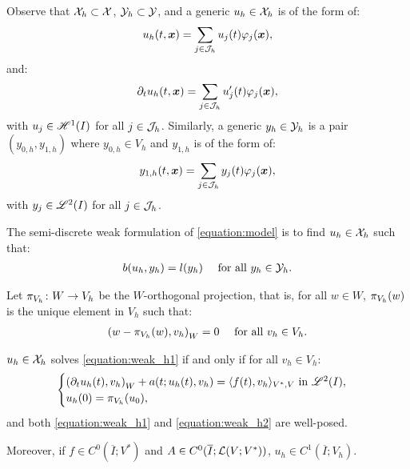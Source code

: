 Observe that $\mathcal{X}_h \subset \mathcal{X}$, $\mathcal{Y}_h \subset \mathcal{Y}$, and a generic $u_h \in \mathcal{X}_h$ is of the form of:
\begin{align}
    u_h(t, \bm{x}) = \sum_{j \in \mathcal{J}_h} u_j(t) \varphi_j(\bm{x}),
\end{align}
and:
\begin{align}
    \partial_t u_h(t, \bm{x}) = \sum_{j \in \mathcal{J}_h} u_j^{\prime}(t) \varphi_j(\bm{x}),
\end{align}
with $u_j \in \mathscr{H}^{1}(I)$ for all $j \in \mathcal{J}_h$. Similarly, a generic $y_h \in \mathcal{Y}_h$ is a pair $(y_{0, h}, y_{1, h})$ where $y_{0, h} \in V_h$ and $y_{1, h}$ is of the form of:
\begin{align}
    y_{1, h}(t, \bm{x}) = \sum_{j \in \mathcal{J}_h} y_j(t) \varphi_j(\bm{x}),
\end{align}
with $y_j \in \mathscr{L}^{2}(I)$ for all $j \in \mathcal{J}_h$.

\begin{definition}
    The semi-discrete weak formulation of \cref{equation:model} is to find $u_h \in \mathcal{X}_h$ such that:
    \begin{align} \label{equation:weak_h1}
        b(u_h, y_h) &= l(y_h) &\text{ for all } y_h \in \mathcal{Y}_h.
    \end{align}
\end{definition}

\begin{definition}[$\ProjectionOnto{V_h}$]
    Let $\pi_{V_h} \colon W \rightarrow V_h$ be the $W$-orthogonal projection, that is, for all $w \in W$, $\pi_{V_h}(w)$ is the unique element in $V_h$ such that:
    \begin{align}
        \left( w - \pi_{V_h}(w), v_h \right)_W &= 0 &\text{ for all } v_h \in V_h.
    \end{align}
\end{definition}

\begin{proposition}[Equivalence]
    $u_h \in \mathcal{X}_h$ solves \cref{equation:weak_h1} if and only if for all $v_h \in V_h$:
    \begin{align}
        \begin{cases} \label{equation:weak_h2}
            \left( \partial_t u_h(t), v_h \right)_W + a(t; u_h(t), v_h) = \langle f(t), v_h \rangle_{V^*, V} \text{ in } \mathscr{L}^{2}(I), \\
            u_h(0) = \pi_{V_h}(u_0),
        \end{cases}
    \end{align}
    and both \cref{equation:weak_h1} and \cref{equation:weak_h2} are well-posed.

    Moreover, if $f \in C^0(\overline{I}; V^*)$ and $A \in C^0(\overline{I}; \mathcal{L}(V; V^*))$, $u_h \in C^1(\overline{I}; V_h)$.
\end{proposition}


